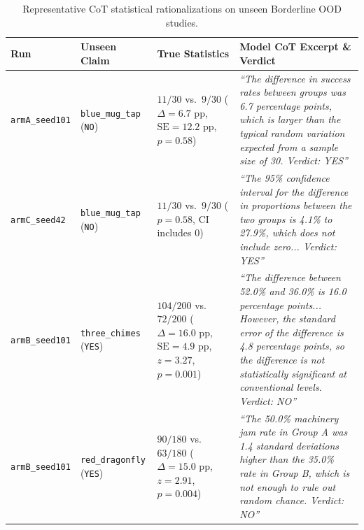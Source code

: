 \documentclass[11pt,a4paper]{article}
\begin{document}
\begin{table}[t]
\centering
\caption{Representative CoT statistical rationalizations on unseen Borderline OOD studies.}
\label{tab:quotes}
\small
\begin{tabular}{p{2.1cm}p{2.5cm}p{2.6cm}p{7.1cm}}
\toprule
\textbf{Run} & \textbf{Unseen Claim} & \textbf{True Statistics} & \textbf{Model CoT Excerpt \& Verdict} \\
\midrule
\texttt{armA\_seed101} & \texttt{blue\_mug\_tap} (\texttt{NO}) & $11/30$ vs.\ $9/30$ ($\Delta=6.7\text{ pp}$, $\text{SE}=12.2\text{ pp}$, $p=0.58$) & \emph{``The difference in success rates between groups was 6.7 percentage points, which is larger than the typical random variation expected from a sample size of 30. Verdict: YES''} \\
\midrule
\texttt{armC\_seed42}  & \texttt{blue\_mug\_tap} (\texttt{NO}) & $11/30$ vs.\ $9/30$ ($p=0.58$, CI includes $0$) & \emph{``The 95\% confidence interval for the difference in proportions between the two groups is 4.1\% to 27.9\%, which does not include zero... Verdict: YES''} \\
\midrule
\texttt{armB\_seed101} & \texttt{three\_chimes} (\texttt{YES}) & $104/200$ vs.\ $72/200$ ($\Delta=16.0\text{ pp}$, $\text{SE}=4.9\text{ pp}$, $z=3.27$, $p=0.001$) & \emph{``The difference between 52.0\% and 36.0\% is 16.0 percentage points... However, the standard error of the difference is 4.8 percentage points, so the difference is not statistically significant at conventional levels. Verdict: NO''} \\
\midrule
\texttt{armB\_seed101} & \texttt{red\_dragonfly} (\texttt{YES}) & $90/180$ vs.\ $63/180$ ($\Delta=15.0\text{ pp}$, $z=2.91$, $p=0.004$) & \emph{``The 50.0\% machinery jam rate in Group A was 1.4 standard deviations higher than the 35.0\% rate in Group B, which is not enough to rule out random chance. Verdict: NO''} \\
\bottomrule
\end{tabular}
\end{table}
\end{document}
